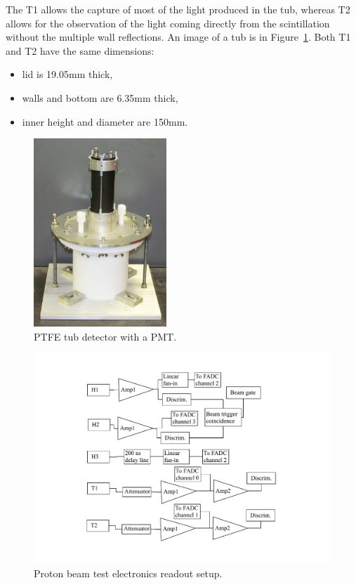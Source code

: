 \documentclass[preprint,12pt]{elsarticle}
\begin{document}
The T1 allows the capture of most of the light produced in the tub, whereas T2 allows for the observation of the light coming directly from the scintillation without the multiple wall reflections. An image of a tub is in Figure~\ref{whitetubpicture}. Both T1 and T2 have the same dimensions:

\begin{itemize}
	\item lid is 19.05mm thick,
	\item walls and bottom are 6.35mm thick,
	\item inner height and diameter are 150mm.
\end{itemize}


\begin{figure}[ht]
\centering
\includegraphics[width=50mm]{figure1_tub.jpg}
\caption{PTFE tub detector with a PMT.} \label{whitetubpicture}
\end{figure}


\begin{figure}[ht]
\centering
\includegraphics[width=130mm]{beamtestschematics.pdf}
\caption{Proton beam test electronics readout setup.} \label{experimentalsetup2}
\end{figure}
\end{document}
